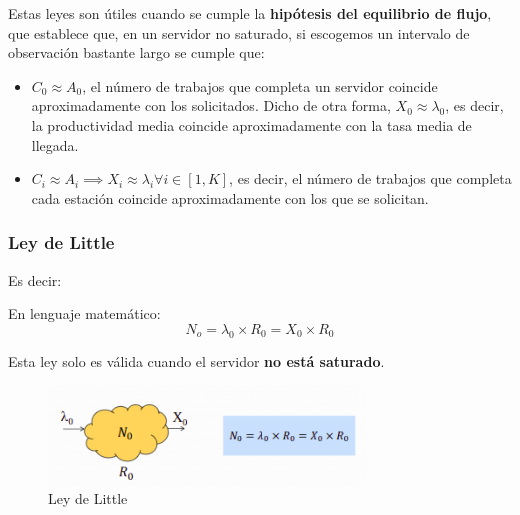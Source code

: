 \documentclass[12pt,spanish]{article}
\begin{document}
Estas leyes son útiles cuando se cumple la \textbf{hipótesis del equilibrio de flujo}, que establece que, en un servidor no saturado, si escogemos un intervalo de observación bastante largo se cumple que:
\begin{itemize}
	\item $C_0 \approx A_0$, el número de trabajos que completa un servidor coincide aproximadamente con los solicitados. Dicho de otra forma, $X_0 \approx \lambda_0$, es decir, la productividad media coincide aproximadamente con la tasa media de llegada.
	\item $C_i \approx A_i \implies X_i \approx \lambda_i \forall i \in [1,K]$, es decir, el número de trabajos que completa cada estación coincide aproximadamente con los que se solicitan.
\end{itemize}

\subsubsection{Ley de Little}
\begin{center}
\end{center}

Es decir:
\begin{center}
\end{center}

En lenguaje matemático:
\begin{equation*}
	N_o=\lambda_0 \times R_0 = X_0 \times R_0
\end{equation*}

Esta ley solo es válida cuando el servidor \textbf{no está saturado}.

\begin{figure}[H]
	\centering
	\includegraphics[width=0.75\textwidth]{leylittle.png}
	\caption{Ley de Little}
\end{figure}
\end{document}
